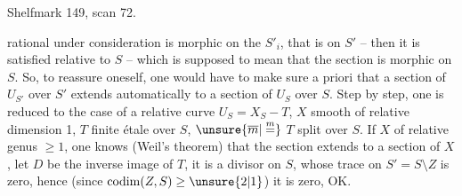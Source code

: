Shelfmark 149, scan 72.

rational under consideration is morphic on the $S'_i$, that is on $S'$ -- then it is satisfied relative to $S$ -- which is supposed to mean that the section is morphic on $S$. So, to reassure oneself, one would have to make sure a priori that a section of $U_{S'}$ over $S'$ extends automatically to  a section of $U_S$ over $S$. Step by step, one is reduced to the case of a relative curve $U_S=X_S-T$, $X$ smooth  of relative dimension 1, $T$ finite étale over $S$,   $\unsure{\overline m|\overset{m}{=}}$ $T$ split over $S$. If $X$ of relative genus $\geq 1$, one knows (Weil's theorem) that the section extends to a section of $X$, let $D$ be the inverse image of $T$, it is a divisor on $S$, whose trace on $S'=S\setminus Z$ is zero, hence (since $\operatorname{codim}(Z,S)\geq\unsure{2|1}$) it is zero, OK.
